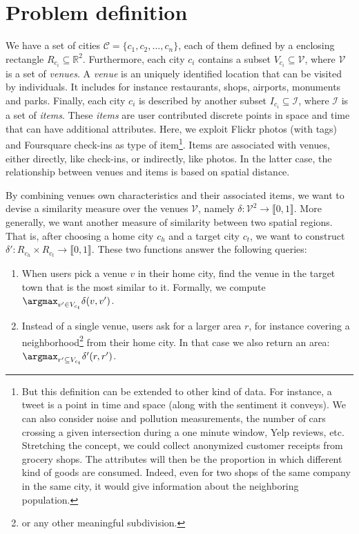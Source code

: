 \section{Problem definition}
\label{sec:problem}

We have a set of cities $\mathcal{C} =
\{c_1, c_2, \ldots, c_n\}$, each of them defined by a enclosing rectangle
$R_{c_i} \subseteq \mathbb{R}^2$. Furthermore, each city $c_i$ contains a
subset $V_{c_i} \subseteq \mathcal{V}$, where $\mathcal{V}$ is a set of
\emph{venues}. A \emph{venue} is an uniquely identified location that can be
visited by individuals. It includes for instance restaurants, shops, airports,
monuments and parks. Finally, each city $c_i$ is described by another subset
$I_{c_i} \subseteq \mathcal{I}$, where $\mathcal{I}$ is a set of \emph{items}.
These \emph{items} are user contributed discrete points in space and time that
can have additional attributes. Here, we exploit Flickr photos (with tags) and
Foursquare check-ins as type of item\footnote{But this definition can be
    extended to other kind of data. For instance, a tweet is a point in time
    and space (along with the sentiment it conveys). We can also consider
    noise and pollution measurements, the number of cars crossing a given
    intersection during a one minute window, Yelp reviews, etc. Stretching the
    concept, we could collect anonymized customer receipts from grocery shops.
    The attributes will then be the proportion in which different kind of
    goods are consumed. Indeed, even for two shops of the same company in the
    same city, it would give information about the neighboring population.}.
Items are associated with venues, either directly, like check-ins, or
indirectly, like photos. In the latter case, the relationship between venues
and items is based on spatial distance.

By combining venues own characteristics and their associated items, we want to
devise a similarity measure over the venues $\mathcal{V}$, namely $\delta:
\mathcal{V}^2 \rightarrow \llbracket 0, 1 \rrbracket $. More generally, we
want another measure of similarity between two spatial regions. That is, after
choosing a home city $c_h$ and a target city $c_t$, we want to construct
$\delta': R_{c_h} \times R_{c_t} \rightarrow \llbracket 0, 1 \rrbracket$.
These two functions answer the following queries:

\begin{enumerate}
\item When users pick a venue $v$ in their home city, find the venue in the
	target town that is the most similar to it. Formally, we compute
	$\argmax_{v' \in V_{c_t}} \delta(v, v')$.\label{q:point}
\item Instead of a single venue, users ask for a larger area $r$, for instance
	covering a neighborhood\footnote{or any other meaningful subdivision.}
	from their home city. In that case we also return an area:
	$\argmax_{r' \subseteq V_{c_t}} \delta'(r, r')$.\label{q:space}
\end{enumerate}


